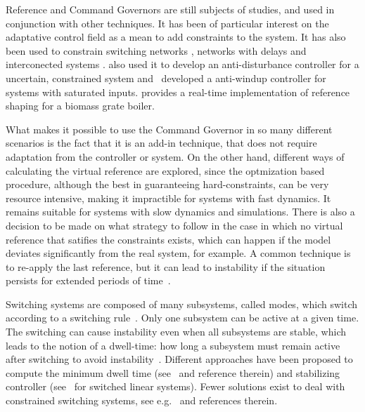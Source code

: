 Reference and Command Governors are still subjects of studies, and used in
conjunction with other techniques. It has been of particular interest on the
adaptative control field
\parencite{arabi.yucelen.ea:command,ristevski.dogan.ea:transient,wilcher.jaramillo.ea:on,dogan.yucelen.ea:improving,gruenwald.yucelen.ea:expanded,makavita.jayasinghe.ea:experimental}
as a mean to add constraints to the system. It has also been used to constrain
switching networks \parencite{ong.djamari.ea:governor}, networks with delays
\parencite{shen.song.ea:constrained} and interconected systems
\parencite{tedesco.casavola:turn-based}. \textcite{peng.wang.ea:constrained}
also used it to develop an anti-disturbance controller for a uncertain,
constrained system and~\textcite{schwerdtner.bortoff.ea:projection-based}
developed a anti-windup controller for systems with saturated inputs.
\textcite{seeber.golles.ea:reference} provides a real-time implementation of
reference shaping for a biomass grate boiler.

What makes it possible to use the Command Governor in so many different
scenarios is the fact that it is an add-in technique, that does not require
adaptation from the controller or system. On the other hand, different ways of
calculating the virtual reference are explored, since the optmization based
procedure, although the best in guaranteeing hard-constraints, can be very
resource intensive, making it impractible for systems with fast dynamics. It
remains suitable for systems with slow dynamics and simulations. There is also a
decision to be made on what strategy to follow in the case in which no virtual
reference that satifies the constraints exists, which can happen if the model
deviates significantly from the real system, for example. A common technique is
to re-apply the last reference, but it can lead to instability if the situation
persists for extended periods of time~\parencite{garone.di-cairano.ea:reference}.

Switching systems are composed of many subsystems, called modes, which switch
according to a switching
rule~\parencite{liberzon:switching,liberzon.morse:basic}. Only one subsystem can
be active at a given time. The switching can cause instability even when all
subsystems are stable, which leads to the notion of a dwell-time: how long a
subsystem must remain active after switching to avoid
instability~\parencite{liberzon.morse:basic}. Different approaches have been
proposed to compute the minimum dwell time
(see~\parencite{chesi.colaneri.ea:computing} and reference therein) and
stabilizing controller (see~\parencite{lin.antsaklis:stability} for switched
linear systems). Fewer solutions exist to deal with constrained switching
systems, see e.g.~\parencite{franzè.lucia.ea:command,lucia.franzè:stabilization}
and references therein.

